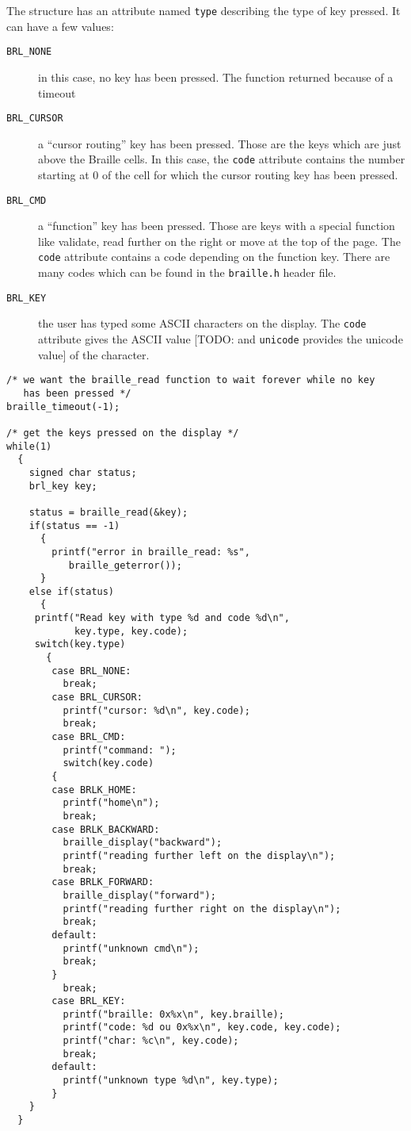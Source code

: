 \documentclass[12pt,a4paper]{article}
\begin{document}
The structure has an attribute named {\tt type} describing the type of
key pressed. It can have a few values:
\begin{description}
\item[{\tt BRL\_NONE}] in this case, no key has been pressed. The function
returned because of a timeout
\item[{\tt BRL\_CURSOR}] a ``cursor routing'' key has been
pressed. Those are the keys which are just above the Braille cells. In
this case, the {\tt code} attribute contains the number starting at 0
of the cell for which the cursor routing key has been pressed.
\item[{\tt BRL\_CMD}] a ``function'' key has been pressed. Those are
keys with a special function like validate, read further on the right
or move at the top of the page. The {\tt code} attribute contains a
code depending on the function key. There are many codes which can be
found in the {\tt braille.h} header file.
\item[{\tt BRL\_KEY}] the user has typed some ASCII characters on the
display. The {\tt code} attribute gives the ASCII value [TODO: and
{\tt unicode} provides the unicode value] of the character.
\end{description}

\begin{verbatim}
/* we want the braille_read function to wait forever while no key
   has been pressed */
braille_timeout(-1);

/* get the keys pressed on the display */
while(1)
  {
    signed char status;
    brl_key key;
    
    status = braille_read(&key);
    if(status == -1)
      {
        printf("error in braille_read: %s",
	       braille_geterror());
      }
    else if(status)
      {
     printf("Read key with type %d and code %d\n",
            key.type, key.code);
     switch(key.type)
       {
        case BRL_NONE:
          break;
        case BRL_CURSOR:
          printf("cursor: %d\n", key.code);
          break;
        case BRL_CMD:
          printf("command: ");
          switch(key.code)
    	{
    	case BRLK_HOME:
    	  printf("home\n");
    	  break;
    	case BRLK_BACKWARD:
    	  braille_display("backward");
    	  printf("reading further left on the display\n");
    	  break;
    	case BRLK_FORWARD:
    	  braille_display("forward");
    	  printf("reading further right on the display\n");
    	  break;
    	default:
    	  printf("unknown cmd\n");
    	  break;
    	}
          break;
        case BRL_KEY:
          printf("braille: 0x%x\n", key.braille);
          printf("code: %d ou 0x%x\n", key.code, key.code);
          printf("char: %c\n", key.code);
          break;
        default:
          printf("unknown type %d\n", key.type);
        }
    }
  }
\end{verbatim}
\end{document}
